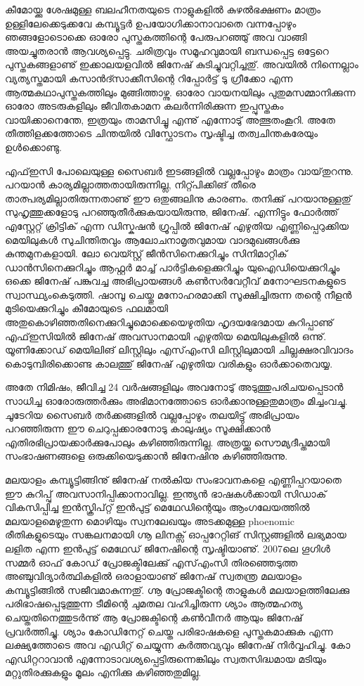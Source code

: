 കീമോയ്ക്കു ശേഷമുള്ള ബലഹീനതയുടെ നാളുകളില്‍ കുഴല്‍ഭക്ഷണം മാത്രം ഉള്ളിലേക്കെടുക്കവേ കമ്പ്യൂട്ടര്‍ ഉപയോഗിക്കാനാവാതെ 
വന്നപ്പോഴും ഞങ്ങളോടൊക്കെ ഓരോ പുസ്തകത്തിന്റെ പേരുപറഞ്ഞു് അവ വാങ്ങി അയച്ചുതരാന്‍ ആവശ്യപ്പെട്ടു. ചരിത്രവും 
സമൂഹവുമായി ബന്ധപ്പെട്ട ഒട്ടേറെ പുസ്തകങ്ങളാണു് ഇക്കാലയളവില്‍ ജിനേഷ് കുടിച്ചുവറ്റിച്ചതു്. അവയില്‍ നിന്നെല്ലാം 
വ്യത്യസ്തമായി കസാന്‍ദ്സാക്കീസിന്റെ റിപ്പോര്‍ട്ട് ടു ഗ്രീക്കോ എന്ന ആത്മകഥാപുസ്തകത്തിലും മുങ്ങിത്താഴ്ന്നു. ഓരോ വായനയിലും 
പുതുമസമ്മാനിക്കുന്ന ഓരോ അടരുകളിലും ജീവിതകാമന കലര്‍ന്നിരിക്കുന്ന ഇപ്പുസ്തകം വായിക്കാനെന്തേ, ഇത്രയും താമസിച്ചൂ 
എന്നു് എന്നോടു് അത്ഭുതംകൂറി.   അതേ തീത്തിളക്കത്തോടെ ചിന്തയില്‍ വിസ്ഫോടനം സൃഷ്ടിച്ച തത്വചിന്തകരേയും ഉള്‍ക്കൊണ്ടു.

എഫ്ഇസി പോലെയുള്ള സൈബര്‍ ഇടങ്ങളില്‍ വല്ലപ്പോഴും മാത്രം വായ്‌തുറന്നു. പറയാന്‍ കാര്യമില്ലാത്തതായിരുന്നില്ല, 
നിറ്റ്പിക്കിങ് തീരെ താത്പര്യമില്ലാതിരുന്നതാണു് ഈ ഒതുങ്ങലിനു കാരണം. തനിക്കു് പറയാനുള്ളതു് സുഹൃത്തുക്കളോടു 
പറഞ്ഞുതീര്‍ക്കുകയായിരുന്നു, ജിനേഷ്. എന്നിട്ടും ഫോര്‍ത്ത് എസ്റ്റേറ്റ് ക്രിട്ടിക്‍ എന്ന ഡിസ്കഷന്‍ ഗ്രൂപ്പില്‍ ജിനേഷ് എഴുതിയ 
എണ്ണിപ്പെറുക്കിയ മെയിലുകള്‍ സുചിന്തിതവും ആലോചനാമൃതവുമായ വാദമുഖങ്ങള്‍ക്കു കുന്തമുനകളായി. ലോ വെയ്സ്റ്റ് 
ജീന്‍സിനെക്കുറിച്ചും സിനിമാറ്റിക്‍ ഡാന്‍സിനെക്കുറിച്ചും ആഫ്റ്റര്‍ മാച്ച് പാര്‍ട്ടികളെക്കുറിച്ചും യുഐഡിയെക്കുറിച്ചും ഒക്കെ 
ജിനേഷ് പങ്കുവച്ച അഭിപ്രായങ്ങള്‍ കണ്‍സര്‍വേറ്റീവ് മനോഘടനകളുടെ സ്വാസ്ഥ്യംകെടുത്തി. ഷാമ്പൂ ചെയ്തു മനോഹരമാക്കി 
സൂക്ഷിച്ചിരുന്ന തന്റെ നീളന്‍ മുടിയെക്കുറിച്ചും കീമോയുടെ ഫലമായി അതുകൊഴിഞ്ഞതിനെക്കുറിച്ചുമൊക്കെയെഴുതിയ 
ഹൃദയഭേദമായ കുറിപ്പാണു് എഫ്ഇസിയില്‍ ജിനേഷ് അവസാനമായി എഴുതിയ മെയിലുകളില്‍ ഒന്നു്. യൂണിക്കോഡ് 
മെയിലിങ് ലിസ്റ്റിലും എസ്എംസി ലിസ്റ്റിലുമായി ചില്ലക്ഷരവിവാദം കൊടുമ്പിരിക്കൊണ്ട കാലത്തു് ജിനേഷ് എഴുതിയ വരികളും 
ഓര്‍ക്കാതെവയ്യ.

അതേ നിമിഷം, ജീവിച്ച 24 വര്‍ഷങ്ങളിലും അവനോടു് അടുത്തുപരിചയപ്പെടാന്‍ സാധിച്ച ഓരോരുത്തര്‍ക്കും അഭിമാനത്തോടെ 
ഓര്‍ക്കാനുള്ളതുമാത്രം മിച്ചംവച്ചു. ചൂടേറിയ സൈബര്‍ തര്‍ക്കങ്ങളില്‍ വല്ലപ്പോഴും തലയിട്ടു് അഭിപ്രായം പറഞ്ഞിരുന്ന ഈ 
ചെറുപ്പക്കാരനോടു കാലുഷ്യം സൂക്ഷിക്കാന്‍ എതിരഭിപ്രായക്കാര്‍ക്കുപോലും കഴിഞ്ഞിരുന്നില്ല. അത്രയ്ക്കു സൌമ്യദീപ്തമായി 
സംഭാഷണങ്ങളെ ഒരുക്കിയെടുക്കാന്‍ ജിനേഷിനു കഴിഞ്ഞിരുന്നു.

മലയാളം കമ്പ്യൂട്ടിങ്ങിനു് ജിനേഷ് നല്‍കിയ സംഭാവനകളെ എണ്ണിപ്പറയാതെ ഈ കുറിപ്പു് അവസാനിപ്പിക്കാനാവില്ല. 
ഇന്ത്യന്‍ ഭാഷകള്‍ക്കായി സിഡാക്‍ വികസിപ്പിച്ച ഇന്‍സ്ക്രിപ്റ്റ് ഇന്‍പുട്ട് മെഥേഡിന്റെയും ആംഗലേയത്തില്‍ മലയാളമെഴുതുന്ന 
മൊഴിയും സ്വനലേഖയും അടക്കമുള്ള phoenomic രീതികളുടെയും സങ്കലനമായി ഗ്നൂ ലിനക്സ് ഓപ്പറേറ്റിങ് സിസ്റ്റങ്ങളില്‍ ലഭ്യമായ 
ലളിത എന്ന ഇന്‍പുട്ട് മെഥേഡ് ജിനേഷിന്റെ സൃഷ്ടിയാണു്. 2007ലെ ഗൂഗിള്‍ സമ്മര്‍ ഓഫ് കോഡ് പ്രോജക്ടിലേക്കു് എസ്എംസി 
തിരഞ്ഞെടുത്ത അഞ്ചുവിദ്യാര്‍ത്ഥികളില്‍ ഒരാളായാണു് ജിനേഷ് സ്വതന്ത്ര മലയാളം കമ്പ്യൂട്ടിങ്ങില്‍ സജീവമാകുന്നതു്. ഗ്നൂ 
പ്രോജക്ടിന്റെ താളുകള്‍ മലയാളത്തിലേക്കു പരിഭാഷപ്പെടുത്തുന്ന ടീമിന്റെ ചുമതല വഹിച്ചിരുന്ന ശ്യാം ആത്മഹത്യ 
ചെയ്തതിനെത്തുടര്‍ന്നു് ആ പ്രോജക്ടിന്റെ കണ്‍വീനര്‍ ആയും ജിനേഷ് പ്രവര്‍ത്തിച്ചു. ശ്യാം കോഡിനേറ്റ് ചെയ്ത പരിഭാഷകളെ 
പുസ്തകമാക്കുക എന്ന ലക്ഷ്യത്തോടെ അവ എഡിറ്റ് ചെയ്യുന്ന കര്‍ത്തവ്യവും ജിനേഷ് നിര്‍വ്വഹിച്ചു. കോ എഡിറ്ററാവാന്‍ 
എന്നോടാവശ്യപ്പെട്ടിരുന്നെങ്കിലും സ്വതസിദ്ധമായ മടിയും മറ്റുതിരക്കുകളും മൂലം എനിക്കു കഴിഞ്ഞതുമില്ല.


